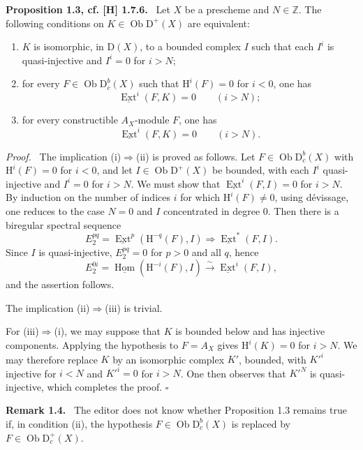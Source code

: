\documentclass[12pt]{article}
\newcommand{\ZZ}{\mathbb Z}
\newcommand{\Hom}{\operatorname{Hom}}
\newcommand{\Ext}{\operatorname{Ext}}
\newcommand{\ob}{\operatorname{Ob}}
\newcommand{\D}{\mathrm D}
\newcommand{\Hh}{\mathrm H}
\newcommand{\qedtext}{\hfill$\square$}
\newenvironment{statement}[1]{\par\medskip\noindent\textbf{#1.}\ }{\par\medskip}
\newenvironment{prooftext}[1][Proof]{\par\noindent\emph{#1.}\ }{\par\medskip}
\begin{document}
\begin{statement}{Proposition 1.3, cf. [H] 1.7.6}
Let $X$ be a prescheme and $N\in\ZZ$. The following conditions on $K\in\ob\D^+(X)$ are equivalent:
\begin{enumerate}[label=(\roman*)]
\item $K$ is isomorphic, in $\D(X)$, to a bounded complex $I$ such that each $I^i$ is quasi-injective and $I^i=0$ for $i>N$;
\item for every $F\in\ob\D_c^b(X)$ such that $\Hh^i(F)=0$ for $i<0$, one has
\[
   \underline{\Ext}^i(F,K)=0\qquad(i>N);
\]
\item for every constructible $A_X$-module $F$, one has
\[
   \underline{\Ext}^i(F,K)=0\qquad(i>N).
\]
\end{enumerate}
\end{statement}

\begin{prooftext}
The implication (i)$\Rightarrow$(ii) is proved as follows. Let $F\in\ob\D_c^b(X)$ with $\Hh^i(F)=0$ for $i<0$, and let $I\in\ob\D^+(X)$ be bounded, with each $I^i$ quasi-injective and $I^i=0$ for $i>N$. We must show that $\underline{\Ext}^i(F,I)=0$ for $i>N$. By induction on the number of indices $i$ for which $\Hh^i(F)\ne0$, using dévissage, one reduces to the case $N=0$ and $I$ concentrated in degree $0$. Then there is a biregular spectral sequence
\[
   E_2^{pq}=\underline{\Ext}^p(\Hh^{-q}(F),I)\Rightarrow \underline{\Ext}^*(F,I).
\]
Since $I$ is quasi-injective, $E_2^{pq}=0$ for $p>0$ and all $q$, hence
\[
   E_2^{0i}=\underline{\Hom}(\Hh^{-i}(F),I)\xrightarrow{\sim}\underline{\Ext}^{i}(F,I),
\]
and the assertion follows.

The implication (ii)$\Rightarrow$(iii) is trivial.

For (iii)$\Rightarrow$(i), we may suppose that $K$ is bounded below and has injective components. Applying the hypothesis to $F=A_X$ gives $\Hh^i(K)=0$ for $i>N$. We may therefore replace $K$ by an isomorphic complex $K'$, bounded, with $K'^i$ injective for $i<N$ and $K'^i=0$ for $i>N$. One then observes that $K'^N$ is quasi-injective, which completes the proof. \qedtext
\end{prooftext}

\begin{statement}{Remark 1.4}
The editor does not know whether Proposition 1.3 remains true if, in condition (ii), the hypothesis $F\in\ob\D_c^b(X)$ is replaced by $F\in\ob\D_c^+(X)$.
\end{statement}
\end{document}
